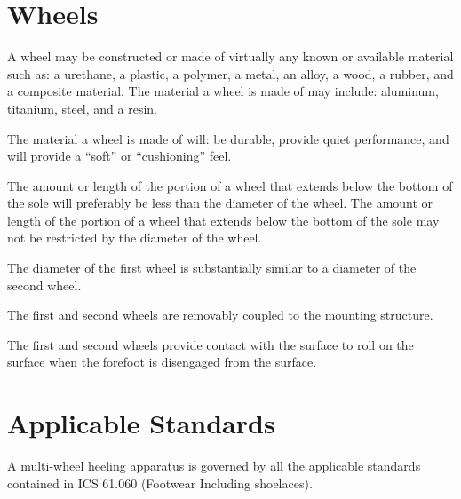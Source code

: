 \documentclass{tech-spec}
\begin{document}
  \section*{Wheels}
  \begin{parnumbers}
    A wheel may be constructed or made of virtually any known or available material such as: a urethane, a plastic, a polymer, a metal, an alloy, a wood, a rubber, and a composite material. The material a wheel is made of may include: aluminum, titanium, steel, and a resin.

    The material a wheel is made of will: be durable, provide quiet performance, and will provide a “soft” or “cushioning” feel.

    The amount or length of the portion of a wheel that extends below the bottom of the sole will preferably be less than the diameter of the wheel. The amount or length of the portion of a wheel that extends below the bottom of the sole may not be restricted by the diameter of the wheel.

    The diameter of the first wheel is substantially similar to a diameter of the second wheel.

    The first and second wheels are removably coupled to the mounting structure.

    The first and second wheels provide contact with the surface to roll on the surface when the forefoot is disengaged from the surface.
  \end{parnumbers}

  \section*{Applicable Standards}
  \begin{parnumbers}
    A multi-wheel heeling apparatus is governed by all the applicable standards contained in ICS 61.060 (Footwear Including shoelaces).
  \end{parnumbers}
\end{document}
